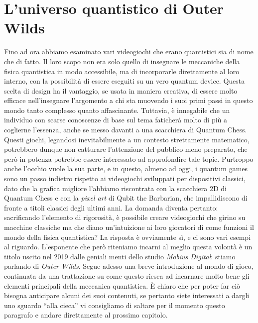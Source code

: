 \documentclass{book}
\theoremstyle{definition}
\theoremstyle{definition}
\theoremstyle{definition}
\theoremstyle{plain}
\theoremstyle{plain}
\theoremstyle{plain}
\theoremstyle{plain}
\begin{document}
\section{L'universo quantistico di Outer Wilds}
Fino ad ora abbiamo esaminato vari videogiochi che erano quantistici sia di nome che di fatto. Il loro scopo non era solo quello di insegnare le meccaniche della fisica quantistica in modo accessibile, ma di incorporarle direttamente al loro interno, con la possibilità di essere eseguiti su un vero quantum device. Questa scelta di design ha il vantaggio, se usata in maniera creativa, di essere molto efficace nell'insegnare l'argomento a chi sta muovendo i suoi primi passi in questo mondo tanto complesso quanto affascinante. Tuttavia, è innegabile che un individuo con scarse conoscenze di base sul tema faticherà molto di più a coglierne l'essenza, anche se messo davanti a una scacchiera di Quantum Chess. Questi giochi, legandosi inevitabilmente a un contesto strettamente matematico, potrebbero dunque non catturare l'attenzione del pubblico meno preparato, che però in potenza potrebbe essere interessato ad approfondire tale topic. Purtroppo anche l'occhio vuole la sua parte, e in questo, almeno ad oggi, i quantum games sono un passo indietro rispetto ai videogiochi sviluppati per dispositivi classici, dato che la grafica migliore l'abbiamo riscontrata con la scacchiera 2D di Quantum Chess e con la \emph{pixel art} di Qubit the Barbarian, che impallidiscono di fronte a titoli classici degli ultimi anni. La domanda diventa pertanto: sacrificando l'elemento di rigorosità, è possibile creare videogiochi che girino su macchine classiche ma che diano un'intuizione ai loro giocatori di come funzioni il mondo della fisica quantistica? La risposta è ovviamente sì, e ci sono vari esempi al riguardo. L'esponente che però riteniamo incarni al meglio questa volontà è un titolo uscito nel 2019 dalle geniali menti dello studio \emph{Mobius Digital}\cite{mobius_digital}: stiamo parlando di \emph{Outer Wilds}. Segue adesso una breve introduzione al mondo di gioco, continuata da una trattazione su come questo riesca ad incarnare molto bene gli elementi principali della meccanica quantistica. È chiaro che per poter far ciò bisogna anticipare alcuni dei suoi contenuti, se pertanto siete interessati a dargli uno sguardo ``alla cieca'' vi consigliamo di saltare per il momento questo paragrafo e andare direttamente al prossimo capitolo.\\
\end{document}
